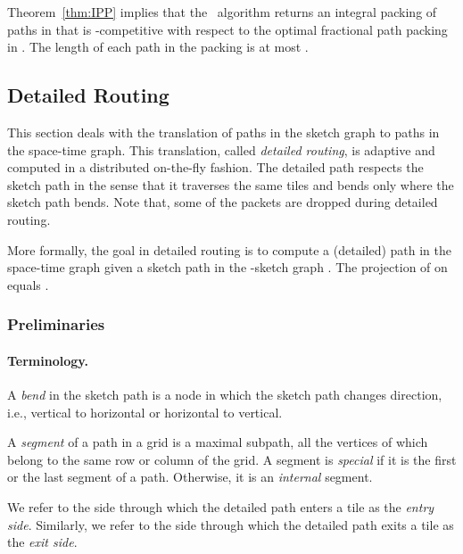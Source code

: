 \documentclass[11pt]{article}
\newcommand{\route}{\text{\sc{ipp}}}
\newcommand{\IPP}{\route}
\newenvironment{proof sketch}[1]{\noindent {\emph{Proof sketch of #1:}}}{\hfill \qed}
\begin{document}
\begin{comment}
A reduction of (fractional) packet routing to (fractional) packing of
paths was presented in~\cite{AZ}.  In this reduction, a packet request
 is reduced to a connection request  in the space-time graph ,
where  is the sink node associated with .
This reduction preserves the (fractional) throughput.
\end{comment}

Theorem~\ref{thm:IPP} implies that the \IPP\ algorithm returns an integral packing of paths in  that is
-competitive with respect to the optimal fractional path packing in . The length of each path in the packing is at most .

\subsection{Detailed Routing}\label{sec:detailed}
This section deals with the translation of paths in the sketch graph to paths in the space-time graph. This translation, called \emph{detailed routing}, is adaptive and computed in a distributed on-the-fly fashion.
The detailed path respects the sketch path in the sense that it traverses the same tiles and bends only where the sketch path bends.
Note that, some of the packets are dropped during detailed routing.


More formally, the goal in detailed routing is to compute a (detailed) path  in
the space-time graph  given a sketch path  in the -sketch graph .
The projection of  on
 equals .


\subsubsection{Preliminaries}

\paragraph{Terminology.}
A \emph{bend} in the sketch path is a node in which the sketch path changes direction, i.e., vertical to horizontal or horizontal to vertical.

A \emph{segment} of a path in a grid is a maximal subpath, all the vertices of which belong to the same row or column of the grid.
A segment is \emph{special} if it is the first or the last segment of a path. Otherwise, it is an \emph{internal} segment.

We refer to the side through which the detailed path enters a tile as the \emph{entry side}.
Similarly, we refer to the side through which the detailed path exits a tile as the \emph{exit side}.
\end{document}
